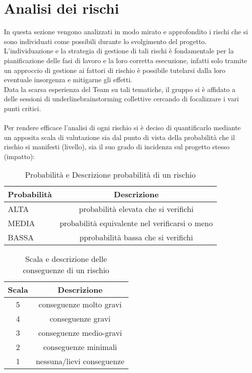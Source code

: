 \section{Analisi dei rischi}
In questa sezione vengono analizzati in modo mirato e approfondito i rischi che si sono individuati come possibili durante lo svolgimento del progetto. L'individuazione e la strategia di gestione di tali rischi è fondamentale per la pianificazione delle fasi di lavoro e la loro corretta esecuzione, infatti solo tramite un approccio di gestione ai fattori di rischio è possibile tutelarsi dalla loro eventuale insorgenza e mitigarne gli effetti.\\
Data la scarsa esperienza del Team su tali tematiche, il gruppo si è affidato a delle sessioni di underline{brainstorming} collettive cercando di focalizzare i vari punti critici. \\\\
Per rendere efficace l'analisi di ogni rischio si è deciso di quantificarlo mediante un apposita scala di valutazione sia dal punto di vista della probabilità che il rischio si manifesti (livello), sia il suo grado di incidenza sul progetto stesso (impatto):\\
\begin{table}[h!]
\centering
\begin{tabular}{|l|c|}
\hline
Probabilità& Descrizione\\
\hline
ALTA & probabilità elevata che si verifichi\\
MEDIA & probabilità equivalente nel verificarsi o meno\\
BASSA & pprobabilità bassa che si verifichi\\
\hline
\end{tabular}
\caption{Probabilità e Descrizione probabilità di un rischio}\label{tab:livellorischi}
\end{table}
\begin{table}[h!]
\centering
\begin{tabular}{|c|c|}
\hline
Scala& Descrizione  \\
\hline
5 & conseguenze molto gravi\\
4 & conseguenze gravi\\
3 & conseguenze medio-gravi\\
2 & conseguenze minimali\\
1 & nessuna/lievi conseguenze\\
\hline
\end{tabular}
\caption{Scala e descrizione delle conseguenze di un rischio}\label{tab:impattorischi}
\end{table}


